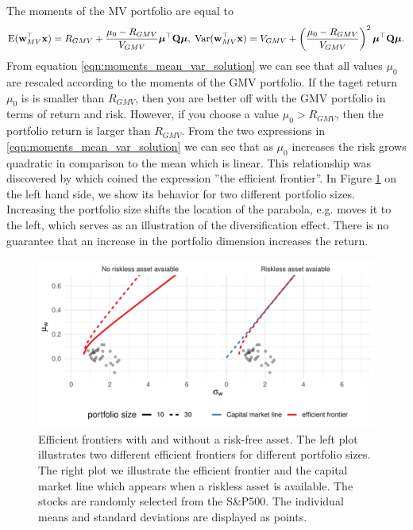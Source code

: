 \documentclass[oneside]{book}\usepackage{knitr}
\begin{document}
The moments of the MV portfolio are equal to
\begin{equation}\label{eqn:moments_mean_var_solution}
\operatorname{E}(\mathbf{w}_{MV}^\top\mathbf{x}) = R_{GMV} + \frac{\mu_0 - R_{GMV}}{V_{GMV}} \mbox{\boldmath$\mu$}^\top \mathbf{Q} \mbox{\boldmath$\mu$}, \;
\operatorname{Var}(\mathbf{w}_{MV}^\top\mathbf{x}) =V_{GMV} + \left(\frac{\mu_0 - R_{GMV}}{V_{GMV}}\right)^2 \mbox{\boldmath$\mu$}^\top \mathbf{Q} \mbox{\boldmath$\mu$}.
\end{equation}
From equation \eqref{eqn:moments_mean_var_solution} we can see that all values $\mu_0$ are rescaled according to the moments of the GMV portfolio. 
If the taget return $\mu_0$ is is smaller than $R_{GMV}$, then you are better off with the GMV portfolio in terms of return and risk.
However, if you choose a value $\mu_0>R_{GMV}$, then the portfolio return is larger than $R_{GMV}$.
From the two expressions in \eqref{eqn:moments_mean_var_solution} we can see that as $\mu_0$ increases the risk grows quadratic in comparison to the mean which is linear. 
This relationship was discovered by \textcite{merton1972} which coined the expression ''the efficient frontier''. 
In Figure \ref{fig:mertons_efficient_frontier} on the left hand side, we show its behavior for two different portfolio sizes. 
Increasing the portfolio size shifts the location of the parabola, e.g. moves it to the left, which serves as an illustration of the diversification effect. 
There is no guarantee that an increase in the portfolio dimension increases the return.
\begin{knitrout}\small
{}\color{fgcolor}\begin{figure}

{\centering \includegraphics[width=\maxwidth]{figure/mertons_efficient_frontier-1} 

}

\caption[Efficient frontiers with and without a risk-free asset]{Efficient frontiers with and without a risk-free asset. The left plot illustrates two different efficient frontiers for different portfolio sizes. The right plot we illustrate the efficient frontier and the capital market line which appears when a riskless asset is available. The stocks are randomly selected from the S\&P500. The individual means and standard deviations are displayed as points.}\label{fig:mertons_efficient_frontier}
\end{figure}

\end{knitrout}
\end{document}

